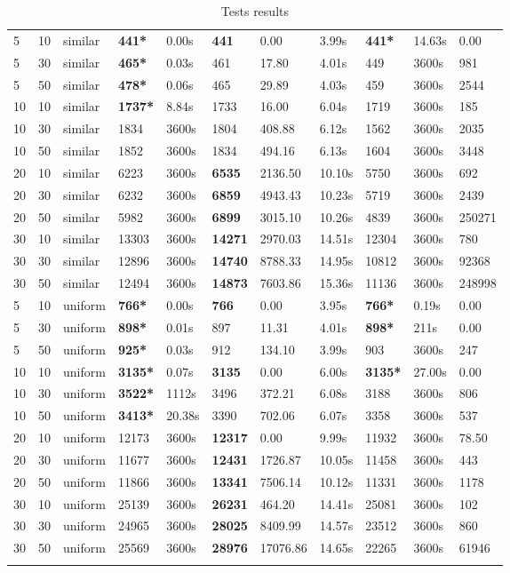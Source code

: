 \begin{scriptsize}
\begin{longtable}{@{\extracolsep{\fill}}l|l|l|ll|lll|lll@{}}
 5 & 10 & similar& \textbf{441*}& 0.00s& \textbf{441}& 0.00& 3.99s & \textbf{441*}& 14.63s & 0.00 \\
 5 & 30 & similar& \textbf{465*}& 0.03s& 461& 17.80& 4.01s & 449& 3600s& 981 \\
 5 & 50 & similar& \textbf{478*}& 0.06s& 465& 29.89& 4.03s & 459& 3600s& 2544 \\
 10 & 10 & similar& \textbf{1737*}& 8.84s& 1733& 16.00& 6.04s & 1719& 3600s& 185 \\
 10 & 30 & similar& 1834& 3600s& 1804& 408.88& 6.12s & 1562& 3600s& 2035 \\
 10 & 50 & similar& 1852& 3600s& 1834& 494.16& 6.13s & 1604& 3600s& 3448 \\
 20 & 10 & similar& 6223& 3600s& \textbf{6535}& 2136.50& 10.10s & 5750& 3600s& 692 \\
 20 & 30 & similar& 6232& 3600s& \textbf{6859}& 4943.43& 10.23s & 5719& 3600s& 2439 \\
 20 & 50 & similar& 5982& 3600s& \textbf{6899}& 3015.10& 10.26s & 4839& 3600s& 250271 \\
 30 & 10 & similar& 13303& 3600s& \textbf{14271}& 2970.03& 14.51s & 12304& 3600s& 780 \\
 30 & 30 & similar& 12896& 3600s& \textbf{14740}& 8788.33& 14.95s & 10812& 3600s& 92368 \\
 30 & 50 & similar& 12494& 3600s& \textbf{14873}& 7603.86& 15.36s & 11136& 3600s& 248998 \\
 5 & 10 & uniform& \textbf{766*}& 0.00s& \textbf{766}& 0.00& 3.95s & \textbf{766*}& 0.19s & 0.00 \\
 5 & 30 & uniform& \textbf{898*}& 0.01s& 897& 11.31& 4.01s & \textbf{898*}& 211s & 0.00 \\
 5 & 50 & uniform& \textbf{925*}& 0.03s& 912& 134.10& 3.99s & 903& 3600s& 247 \\
 10 & 10 & uniform& \textbf{3135*}& 0.07s& \textbf{3135}& 0.00& 6.00s & \textbf{3135*}& 27.00s & 0.00 \\
 10 & 30 & uniform& \textbf{3522*}& 1112s & 3496& 372.21& 6.08s & 3188& 3600s& 806 \\
 10 & 50 & uniform& \textbf{3413*}& 20.38s& 3390& 702.06& 6.07s & 3358& 3600s& 537 \\
 20 & 10 & uniform& 12173& 3600s& \textbf{12317}& 0.00& 9.99s & 11932& 3600s& 78.50 \\
 20 & 30 & uniform& 11677& 3600s& \textbf{12431}& 1726.87& 10.05s & 11458& 3600s& 443 \\
 20 & 50 & uniform& 11866& 3600s& \textbf{13341}& 7506.14& 10.12s & 11331& 3600s& 1178 \\
 30 & 10 & uniform& 25139& 3600s& \textbf{26231}& 464.20& 14.41s & 25081& 3600s& 102 \\
 30 & 30 & uniform& 24965& 3600s& \textbf{28025}& 8409.99& 14.57s & 23512& 3600s& 860 \\
 30 & 50 & uniform& 25569& 3600s& \textbf{28976}& 17076.86& 14.65s & 22265& 3600s& 61946 \\
\hline 
\caption{Tests results}\\ 
\end{longtable}
\end{scriptsize}

